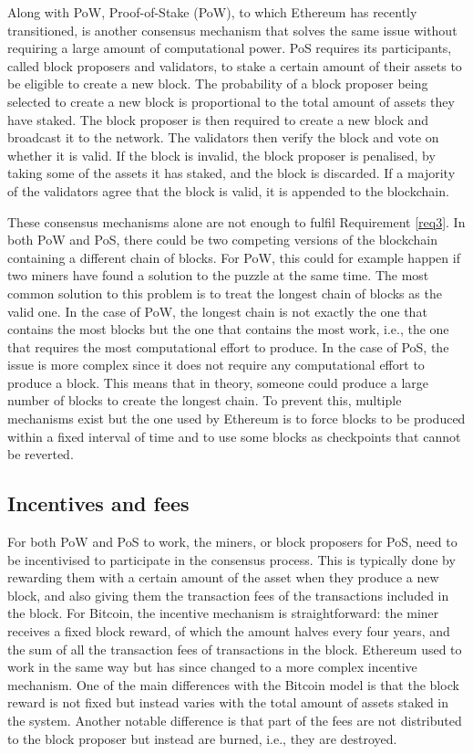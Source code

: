  Along with PoW, Proof-of-Stake (PoW), to which Ethereum has recently transitioned, is another consensus mechanism that solves the same issue without requiring a large amount of computational power.
PoS requires its participants, called block proposers and validators, to stake a certain amount of their assets to be eligible to create a new block.
The probability of a block proposer being selected to create a new block is proportional to the total amount of assets they have staked.
The block proposer is then required to create a new block and broadcast it to the network.
The validators then verify the block and vote on whether it is valid.
If the block is invalid, the block proposer is penalised, by taking some of the assets it has staked, and the block is discarded.
If a majority of the validators agree that the block is valid, it is appended to the blockchain.

These consensus mechanisms alone are not enough to fulfil Requirement \ref{req3}.
In both PoW and PoS, there could be two competing versions of the blockchain containing a different chain of blocks.
For PoW, this could for example happen if two miners have found a solution to the puzzle at the same time.
The most common solution to this problem is to treat the longest chain of blocks as the valid one.
In the case of PoW, the longest chain is not exactly the one that contains the most blocks but the one that contains the most work, i.e., the one that requires the most computational effort to produce.
In the case of PoS, the issue is more complex since it does not require any computational effort to produce a block.
This means that in theory, someone could produce a large number of blocks to create the longest chain.
To prevent this, multiple mechanisms exist but the one used by Ethereum is to force blocks to be produced within a fixed interval of time and to use some blocks as checkpoints that cannot be reverted.


\subsection{Incentives and fees}
For both PoW and PoS to work, the miners, or block proposers for PoS, need to be incentivised to participate in the consensus process.
This is typically done by rewarding them with a certain amount of the asset when they produce a new block, and also giving them the transaction fees of the transactions included in the block.
For Bitcoin, the incentive mechanism is straightforward: the miner receives a fixed block reward, of which the amount halves every four years, and the sum of all the transaction fees of transactions in the block.
Ethereum used to work in the same way but has since changed to a more complex incentive mechanism.
One of the main differences with the Bitcoin model is that the block reward is not fixed but instead varies with the total amount of assets staked in the system.
Another notable difference is that part of the fees are not distributed to the block proposer but instead are burned, i.e., they are destroyed.

